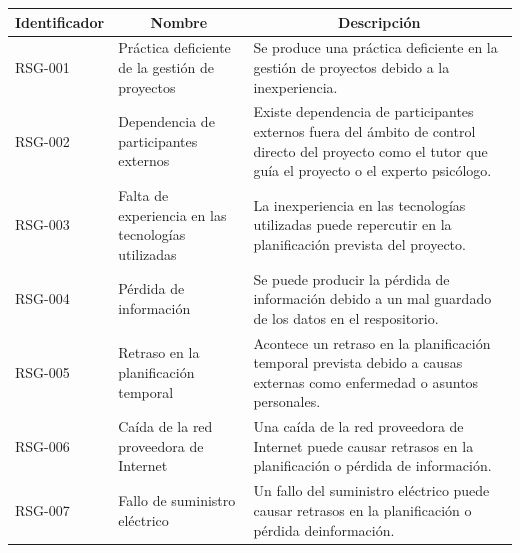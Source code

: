 \begin{table}[htpb]
\centering
\begin{tabularx}{\textwidth}{|l|X|X|}
\hline
\multicolumn{1}{|c|}{\textbf{Identificador}} & \multicolumn{1}{c|}{\textbf{Nombre}}                        & \multicolumn{1}{c|}{\textbf{Descripción}}                                                                                                                                                              \\ \hline
RSG-001                             & Práctica deficiente de la gestión de proyectos     & Se produce una práctica deficiente en la gestión de proyectos debido a la inexperiencia.                                                                                                      \\ \hline
RSG-002                             & Dependencia de participantes externos              & Existe dependencia de participantes externos fuera del ámbito de control directo del proyecto como el tutor que guía el proyecto o el experto psicólogo.                                      \\ \hline
RSG-003                             & Falta de experiencia en las tecnologías utilizadas & La inexperiencia en las tecnologías utilizadas puede repercutir en la planificación prevista del proyecto.                                                                                    \\ \hline
RSG-004                             & Pérdida de información                             & Se puede producir la pérdida de información debido a un mal guardado de los datos en el respositorio.                                                                                         \\ \hline
RSG-005                             & Retraso en la planificación temporal               & Acontece un retraso en la planificación temporal prevista debido a causas externas como enfermedad o asuntos personales.                                                                      \\ \hline
RSG-006                             & Caída de la red proveedora de Internet             & Una caída de la red proveedora de Internet puede causar retrasos en la planificación o pérdida de información.                                                                                 \\ \hline
RSG-007                             & Fallo de suministro eléctrico                      & Un fallo del suministro eléctrico  puede causar retrasos en la planificación o pérdida deinformación.                                                                                         \\ \hline

\end{tabularx}
\end{table}
